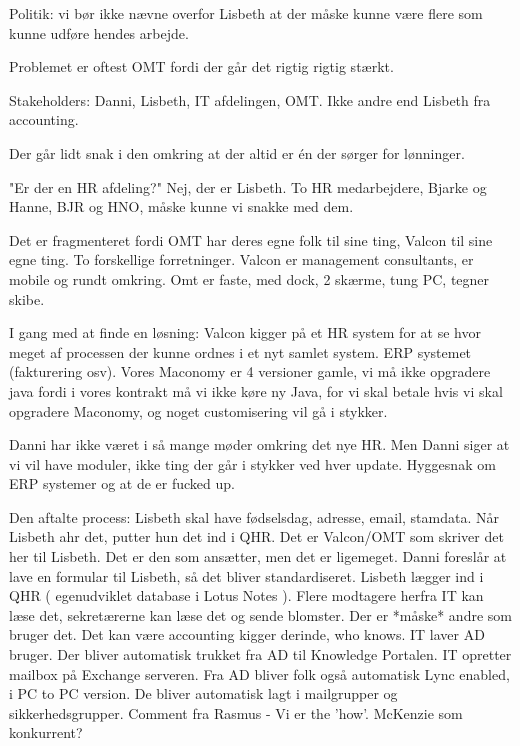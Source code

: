 Politik: vi bør ikke nævne overfor Lisbeth at der måske kunne være flere som kunne udføre hendes arbejde.

Problemet er oftest OMT fordi der går det rigtig rigtig stærkt.


Stakeholders: Danni, Lisbeth, IT afdelingen, OMT. Ikke andre end Lisbeth fra accounting.


Der går lidt snak i den omkring at der altid er én der sørger for lønninger.


"Er der en HR afdeling?" Nej, der er Lisbeth. To HR medarbejdere, Bjarke og Hanne, BJR og HNO, måske kunne vi snakke med dem.


Det er fragmenteret fordi OMT har deres egne folk til sine ting, Valcon til sine egne ting. To forskellige forretninger. Valcon er management consultants, er mobile og rundt omkring. Omt er faste, med dock, 2 skærme, tung PC, tegner skibe.


I gang med at finde en løsning: Valcon kigger på et HR system for at se hvor meget af processen der kunne ordnes i et nyt samlet system. 
ERP systemet (fakturering osv). Vores Maconomy er 4 versioner gamle, vi må ikke opgradere java fordi i vores kontrakt må vi ikke køre ny Java, for vi skal betale hvis vi skal opgradere Maconomy, og noget customisering vil gå i stykker.


Danni har ikke været i så mange møder omkring det nye HR. Men Danni siger at vi vil have moduler, ikke ting der går i stykker ved hver update.
Hyggesnak om ERP systemer og at de er fucked up.


Den aftalte process: Lisbeth skal have fødselsdag, adresse, email, stamdata. Når Lisbeth ahr det, putter hun det ind i QHR. Det er Valcon/OMT som skriver det her til Lisbeth. Det er den som ansætter, men det er ligemeget.
Danni foreslår at lave en formular til Lisbeth, så det bliver standardiseret.
Lisbeth lægger ind i QHR ( egenudviklet database i Lotus Notes ). Flere modtagere herfra
IT kan læse det, sekretærerne kan læse det og sende blomster. Der er *måske* andre som bruger det. Det kan være accounting kigger derinde, who knows.
IT laver AD bruger. Der bliver automatisk trukket fra AD til Knowledge Portalen. IT opretter mailbox på Exchange serveren. Fra AD bliver folk også automatisk Lync enabled, i PC to PC version. De bliver automatisk lagt i mailgrupper og sikkerhedsgrupper.
Comment fra Rasmus - Vi er the 'how'. McKenzie som konkurrent?